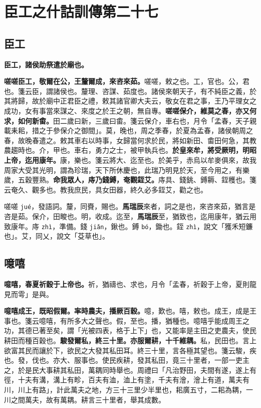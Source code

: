 \chapter{臣工之什詁訓傳第二十七}

\section{臣工}


\textbf{臣工，諸侯助祭遣於廟也。}

\textbf{嗟嗟臣工，敬爾在公，王釐爾成，來咨來茹。}{\footnotesize 嗟嗟，敕之也。工，官也。公，君也。箋云臣，謂諸侯也。釐理、咨謀、茹度也。諸侯來朝天子，有不純臣之義，於其將歸，故於廟中正君臣之禮，敕其諸官卿大夫云，敬女在君之事，王乃平理女之成功，女有事當來謀之、來度之於王之朝，無自專。}\textbf{嗟嗟保介，維莫之春，亦又何求，如何新畬。}{\footnotesize 田二歲曰新，三歲曰畬。箋云保介，車右也，月令「孟春，天子親載耒耜，措之于參保介之御間」。莫，晚也，周之季春，於夏為孟春，諸侯朝周之春，故晚春遣之。敕其車右以時事，女歸當何求於民，將如新田、畬田何急，其教農趨時也。介，甲也。車右，勇力之士，被甲執兵也。}\textbf{於皇來牟，將受厥明，明昭上帝，迄用康年。}{\footnotesize 康，樂也。箋云將大、迄至也。於美乎，赤烏以牟麥俱來，故我周家大受其光明，謂為珍瑞，天下所休慶也，此瑞乃明見於天，至今用之，有樂歲，五穀豐熟。}\textbf{命我眾人，庤乃錢鎛，奄觀銍艾。}{\footnotesize 庤具、錢銚、鎛耨、銍穫也。箋云奄久、觀多也。教我庶民，具女田器，終久必多銍艾，勸之也。}

\begin{quoting}嗟嗟 \texttt{jué}，發語詞。釐，同賚，賜也。\textbf{馬瑞辰}來者，詞之是也，來咨來茹，猶言是咨是茹。保介，田畯也。明，收成。迄至，\textbf{馬瑞辰}至，猶致也，迄用康年，猶云用致康年。庤 \texttt{zhì}，準備。錢 \texttt{jiǎn}，鍬也。鎛 \texttt{bó}，鋤也。銍 \texttt{zhì}，說文「獲禾短鐮也」。艾，同乂，說文「芟草也」。\end{quoting}

\section{噫嘻}


\textbf{噫嘻，春夏祈穀于上帝也。}{\footnotesize 祈，猶禱也、求也，月令「孟春，祈穀于上帝，夏則龍見而雩」是與。}

\textbf{噫嘻成王，既昭假爾。率時農夫，播厥百穀。}{\footnotesize 噫，歎也。嘻，敕也。成王，成是王事也。箋云噫嘻，有所多大之聲也。假，至也。播，猶種也。噫嘻乎能成周王之功，其德已著至矣，謂「光被四表，格于上下」也，又能率是主田之吏農夫，使民耕田而種百穀也。}\textbf{駿發爾私，終三十里。亦服爾耕，十千維耦。}{\footnotesize 私，民田也。言上欲富其民而讓於下，欲民之大發其私田耳。終三十里，言各極其望也。箋云駿，疾也。發，伐也。亦大、服事也。使民疾耕，發其私田，竟三十里者，一部一吏主之，於是民大事耕其私田，萬耦同時舉也。周禮曰「凡治野田，夫間有遂，遂上有徑，十夫有溝，溝上有畛，百夫有洫，洫上有塗，千夫有澮，澮上有道，萬夫有川，川上有路」，計此萬夫之地，方三十三里少半里也，耜廣五寸，二耜為耦，一川之間萬夫，故有萬耦。耕言三十里者，舉其成數。}

